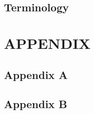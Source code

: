 \documentclass{csereport}
\begin{document}
\cleardoublepage
~
\listoffigures

~
\listoftables


\cleardoublepage
\chapter*{Terminology}


\cleardoublepage
\renewcommand{\thesubsection}{\Roman{subsection}}

\appendix
\part*{APPENDIX}
\cleardoublepage

\chapter{Appendix A}

\cleardoublepage
\chapter{Appendix B}


\cleardoublepage
\end{document}
